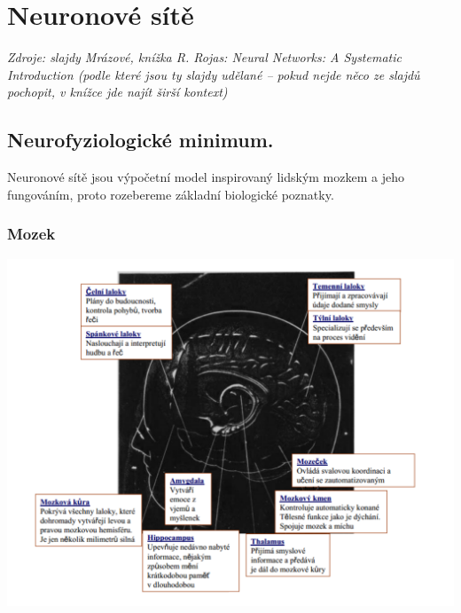 \documentclass[11pt]{report} %
\numberwithin{equation}{section}
\begin{document}
\chapter{Neuronové sítě}
\textit{Zdroje: slajdy Mrázové, knížka R. Rojas: Neural Networks: A Systematic Introduction (podle které jsou ty slajdy udělané -- pokud nejde něco ze slajdů pochopit, v knížce jde najít širší kontext)}

\section{Neurofyziologické minimum.}
Neuronové sítě jsou výpočetní model inspirovaný lidským mozkem a jeho fungováním, proto rozebereme základní biologické poznatky.

\subsection{Mozek}

\includegraphics[width=\textwidth]{img/mozek.png}
\end{document}
